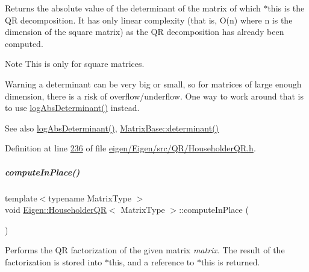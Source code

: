 \begin{DoxyReturn}{Returns}
the absolute value of the determinant of the matrix of which $\ast$this is the QR decomposition. It has only linear complexity (that is, O(n) where n is the dimension of the square matrix) as the QR decomposition has already been computed.
\end{DoxyReturn}
\begin{DoxyNote}{Note}
This is only for square matrices.
\end{DoxyNote}
\begin{DoxyWarning}{Warning}
a determinant can be very big or small, so for matrices of large enough dimension, there is a risk of overflow/underflow. One way to work around that is to use \hyperlink{group___q_r___module_af61b6dbef34fc51c825182b16dc43ca1}{log\+Abs\+Determinant()} instead.
\end{DoxyWarning}
\begin{DoxySeeAlso}{See also}
\hyperlink{group___q_r___module_af61b6dbef34fc51c825182b16dc43ca1}{log\+Abs\+Determinant()}, \hyperlink{group___core___module_a7ad8f77004bb956b603bb43fd2e3c061}{Matrix\+Base\+::determinant()} 
\end{DoxySeeAlso}


Definition at line \hyperlink{eigen_2_eigen_2src_2_q_r_2_householder_q_r_8h_source_l00236}{236} of file \hyperlink{eigen_2_eigen_2src_2_q_r_2_householder_q_r_8h_source}{eigen/\+Eigen/src/\+Q\+R/\+Householder\+Q\+R.\+h}.

\mbox{\label{group___q_r___module_a3a16530338a734971fc45efb0ef9ac94}} 
\subparagraph{\texorpdfstring{compute\+In\+Place()}{computeInPlace()}}
{\footnotesize\ttfamily template$<$typename Matrix\+Type $>$ \\
void \hyperlink{group___q_r___module_class_eigen_1_1_householder_q_r}{Eigen\+::\+Householder\+QR}$<$ Matrix\+Type $>$\+::compute\+In\+Place (\begin{DoxyParamCaption}{ }\end{DoxyParamCaption})\hspace{0.3cm}{\ttfamily [protected]}}

Performs the QR factorization of the given matrix {\itshape matrix}. The result of the factorization is stored into {\ttfamily $\ast$this}, and a reference to {\ttfamily $\ast$this} is returned.

